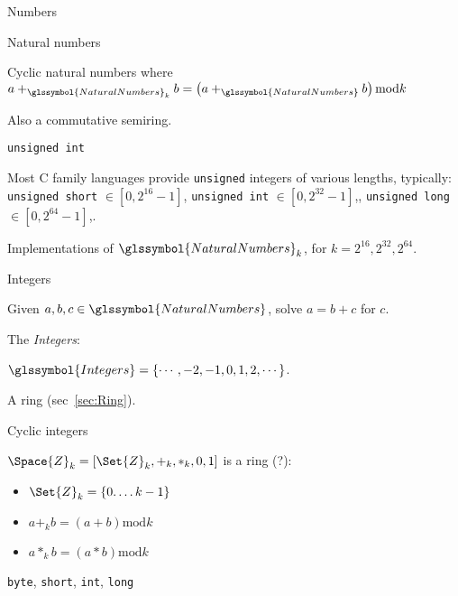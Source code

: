\begin{plSection}{Numbers}
\begin{plSection}{Natural numbers}
\begin{plSection}{Cyclic natural numbers}
where
$a +_{\glssymbol{NaturalNumbers}_{k}} b =
\left( a +_{\glssymbol{NaturalNumbers}} b \right) \text{mod} k$

Also a commutative semiring.

\end{plSection}%
\begin{plSection}{\texttt{unsigned int}}
\label{sec:unsigned-int}

Most C family languages provide \texttt{unsigned} integers
of various lengths, typically: 
\texttt{unsigned short} $\in \left[ 0, 2^{16} - 1 \right]$,
\texttt{unsigned int} $\in \left[ 0, 2^{32} - 1 \right]$,,
\texttt{unsigned long} $\in \left[ 0, 2^{64} - 1 \right]$,.

Implementations of $\glssymbol{NaturalNumbers}_{k}$,
for $k = 2^{16}, 2^{32}, 2^{64}$.

\end{plSection}%
\end{plSection}%
\begin{plSection}{Integers}
\label{sec:Integers}

Given $a,b,c \in \glssymbol{NaturalNumbers}$,
solve $a = b + c$ for $c$.

The \textit{\gls{Integers}}: 

$\glssymbol{Integers} = \left\{\cdots, -2, -1, 0, 1, 2, \cdots\right\}$.

A ring (sec~\ref{sec:Ring}).
\begin{plSection}{Cyclic integers}
\label{sec:Cyclic-integers}

$\Space{Z}_{k} = \left[ \Set{Z}_{k}, +_k, *_k, 0, 1 \right]$
is a ring (?):
\begin{itemize}
  \item $\Set{Z}_{k} = \left\{ 0. \ldots k-1  \right\}$
  \item $ a +_k b = \left( a + b \right) \text{mod} k$
  \item $ a *_k b = \left( a * b \right) \text{mod} k$
\end{itemize}

\end{plSection}%
\begin{plSection}{\texttt{byte}, \texttt{short}, \texttt{int},
 \texttt{long}}
\label{sec:int}


\end{plSection}
\end{plSection}
\end{plSection}
